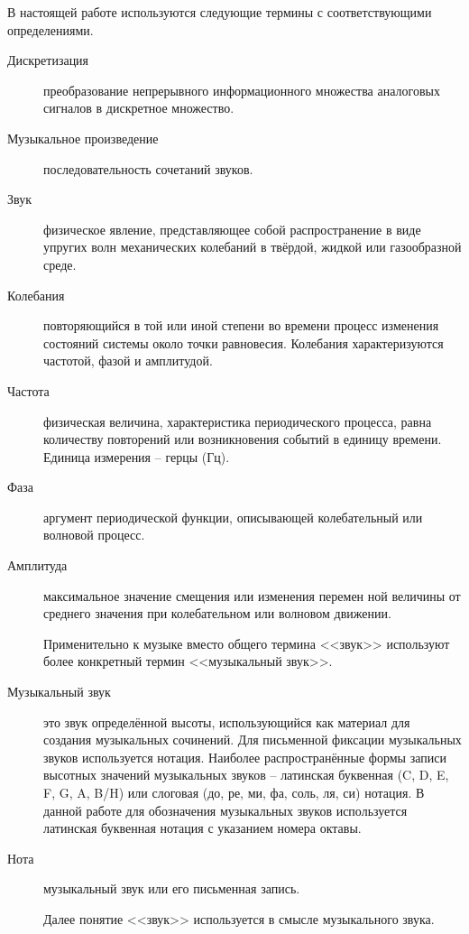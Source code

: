 \Defines %
В настоящей работе используются следующие термины с соответствующими
определениями.
\begin{description}
\item[Дискретизация] преобразование непрерывного информационного множества аналоговых сигналов в дискретное множество.
\item[Музыкальное произведение] последовательность сочетаний звуков.
\item[Звук] физическое явление, представляющее собой распространение в виде упругих волн механических колебаний в твёрдой, жидкой или газообразной среде.
\item[Колебания] повторяющийся в той или иной степени во времени процесс изменения состояний системы около точки равновесия. Колебания характеризуются частотой, фазой и амплитудой.
\item[Частота] физическая величина, характеристика периодического процесса, равна количеству повторений или возникновения событий в единицу времени. Единица измерения -- герцы (Гц).
\item[Фаза] аргумент периодической функции, описывающей колебательный
или волновой процесс.
\item[Амплитуда] максимальное значение смещения или изменения перемен­
ной величины от среднего значения при колебательном или волновом движении.

Применительно к музыке вместо общего термина <<звук>> используют более конкретный термин <<музыкальный звук>>.
\item[Музыкальный звук] это звук определённой высоты, использующийся
как материал для создания музыкальных сочинений. Для письменной фиксации му­зыкальных звуков используется нотация. Наиболее распространённые формы записи высотных значений музыкальных звуков – латинская буквенная (C, D, E, F, G, A, B/H) или слоговая (до, ре, ми, фа, соль, ля, си) нотация. В данной работе для обозначения музыкальных звуков используется латинская буквенная нотация с указанием номера октавы.
\item[Нота] музыкальный звук или его письменная запись.

Далее понятие <<звук>> используется в смысле музыкального звука.


\end{description}
